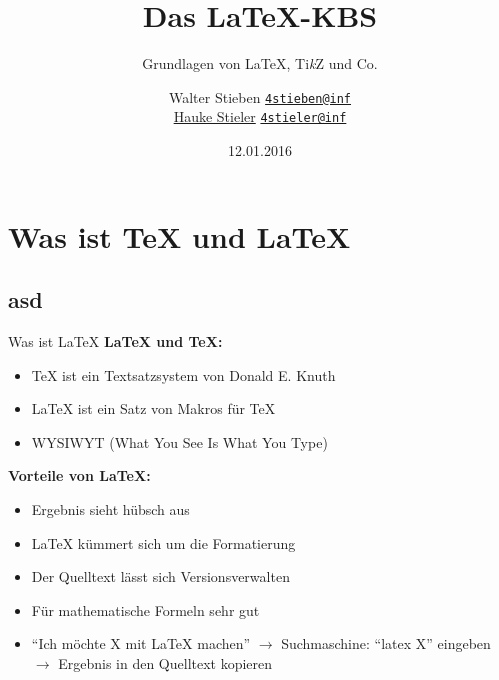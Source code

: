 \documentclass{beamer}
\title{Das \LaTeX-KBS}
\subtitle{\small Grundlagen von \LaTeX, Ti\textit{k}Z und Co.}
\author
{
	Walter Stieben \texttt{\href{mailto:4stieben@informatik.uni-hamburg.de}{4stieben@inf}}\\
	\href{http://hauke-stieler.de/}{Hauke Stieler} \texttt{\href{mailto:4stieler@informatik.uni-hamburg.de}{4stieler@inf}}
}
\date{\footnotesize 12.01.2016}
\begin{document}
	\maketitle
	\tableofcontents\newpage
	\section{Was ist \TeX{} und \LaTeX{}}
		\subsection*{asd}
		\begin{frame}{Was ist \LaTeX{}}
			\textbf{\LaTeX{} und \TeX{}:}
			\begin{itemize}
				\item \TeX{} ist ein Textsatzsystem von Donald E. Knuth
				\item \LaTeX{} ist ein Satz von Makros für \TeX
				\item WYSIWYT (What You See Is What You Type)
			\end{itemize}
			\vspace{0.2cm}
			\textbf{Vorteile von \LaTeX{}:}
			\begin{itemize}
				\item Ergebnis sieht hübsch aus
				\item \LaTeX{} kümmert sich um die Formatierung
				\item Der Quelltext lässt sich Versionsverwalten
				\item Für mathematische Formeln sehr gut
				\item ``Ich möchte X mit \LaTeX{} machen'' $\rightarrow$
				Suchmaschine: ``latex X'' eingeben $\rightarrow$
				Ergebnis in den Quelltext kopieren
			\end{itemize}
		\end{frame}
\end{document}
